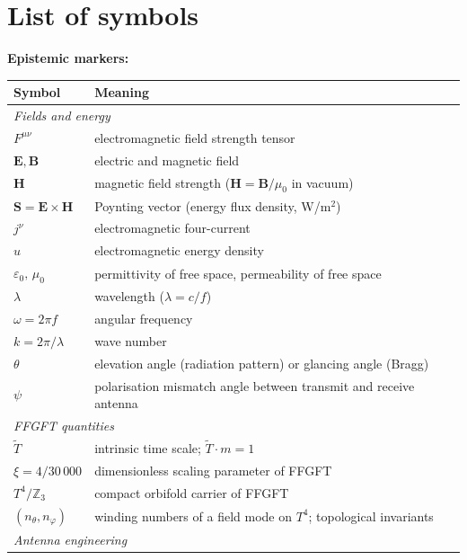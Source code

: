 \section*{List of symbols}

\medskip
\textbf{Epistemic markers:}\par


\medskip
\begin{longtable}{@{}lp{11cm}@{}}
\toprule
\textbf{Symbol} & \textbf{Meaning} \\
\midrule
\multicolumn{2}{l}{\textit{Fields and energy}} \\
$F^{\mu\nu}$ & electromagnetic field strength tensor \\
$\mathbf{E}, \mathbf{B}$ & electric and magnetic field \\
$\mathbf{H}$ & magnetic field strength ($\mathbf{H} = \mathbf{B}/\mu_0$ in vacuum) \\
$\mathbf{S} = \mathbf{E}\times\mathbf{H}$ & Poynting vector (energy flux density, W/m$^2$) \\
$j^\nu$ & electromagnetic four-current \\
$u$ & electromagnetic energy density \\
$\varepsilon_0,\,\mu_0$ & permittivity of free space, permeability of free space \\
$\lambda$ & wavelength ($\lambda = c/f$) \\
$\omega = 2\pi f$ & angular frequency \\
$k = 2\pi/\lambda$ & wave number \\
$\theta$ & elevation angle (radiation pattern) or glancing angle (Bragg) \\
$\psi$ & polarisation mismatch angle between transmit and receive antenna \\
\midrule
\multicolumn{2}{l}{\textit{FFGFT quantities}} \\
$\tilde{T}$ & intrinsic time scale; $\tilde{T} \cdot m = 1$ \\
$\xi = 4/30\,000$ & dimensionless scaling parameter of FFGFT \\
$T^4/\mathbb{Z}_3$ & compact orbifold carrier of FFGFT \\
$(n_\theta, n_\varphi)$ & winding numbers of a field mode on $T^4$; topological invariants \\
\midrule
\multicolumn{2}{l}{\textit{Antenna engineering}} \\

\end{longtable}
